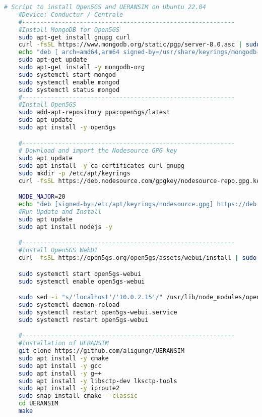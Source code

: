 \begin{lstlisting}[language=Bash, caption=Script]
    # Script to install Open5GS and UERANSIM on Ubuntu 22.04
    #Device: Conductur / Centrale
    #-----------------------------------------------------------
    #Install MongoDB for Open5GS
    sudo apt-get install gnupg curl
    curl -fsSL https://www.mongodb.org/static/pgp/server-8.0.asc | sudo gpg -o /usr/share/keyrings/mongodb-server-8.0.gpg --dearmor
    echo "deb [ arch=amd64,arm64 signed-by=/usr/share/keyrings/mongodb-server-8.0.gpg ] https://repo.mongodb.org/apt/ubuntu noble/mongodb-org/8.0 multiverse" | sudo tee /etc/apt/sources.list.d/mongodb-org-8.0.list
    sudo apt-get update
    sudo apt-get install -y mongodb-org
    sudo systemctl start mongod
    sudo systemctl enable mongod
    sudo systemctl status mongod
    #-----------------------------------------------------------
    #Install Open5GS
    sudo add-apt-repository ppa:open5gs/latest
    sudo apt update
    sudo apt install -y open5gs

    #-----------------------------------------------------------
    # Download and import the Nodesource GPG key
    sudo apt update
    sudo apt install -y ca-certificates curl gnupg
    sudo mkdir -p /etc/apt/keyrings
    curl -fsSL https://deb.nodesource.com/gpgkey/nodesource-repo.gpg.key | sudo gpg --dearmor -o /etc/apt/keyrings/nodesource.gpg

    NODE_MAJOR=20
    echo "deb [signed-by=/etc/apt/keyrings/nodesource.gpg] https://deb.nodesource.com/node_$NODE_MAJOR.x nodistro main" | sudo tee /etc/apt/sources.list.d/nodesource.list
    #Run Update and Install
    sudo apt update
    sudo apt install nodejs -y

    #-----------------------------------------------------------
    #Install Open5GS WebUI
    curl -fsSL https://open5gs.org/open5gs/assets/webui/install | sudo -E bash -

    sudo systemctl start open5gs-webui
    sudo systemctl enable open5gs-webui

    sudo sed -i "s/'localhost'/'10.0.2.15'/" /usr/lib/node_modules/open5gs/server/index.js # Change localhost
    sudo systemctl daemon-reload
    sudo systemctl restart open5gs-webui.service
    sudo systemctl restart open5gs-webui

    #-----------------------------------------------------------
    #Installation of UERANSIM
    git clone https://github.com/aligungr/UERANSIM
    sudo apt install -y cmake
    sudo apt install -y gcc
    sudo apt install -y g++
    sudo apt install -y libsctp-dev lksctp-tools
    sudo apt install -y iproute2
    sudo snap install cmake --classic
    cd UERANSIM
    make


\end{lstlisting}
